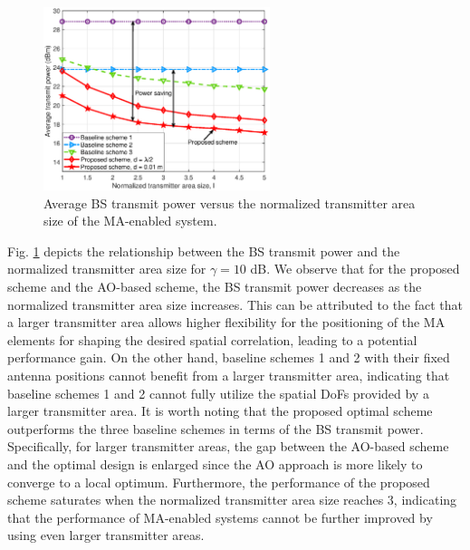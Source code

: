 \documentclass[12pt, draftclsnofoot, onecolumn]{IEEEtran}
\begin{document}
\begin{figure}
    \centering
    \includegraphics[width=2.6in]{figures/Tran_power_vs_Num_points_4_4_MIMO_FR_model.eps}
    \caption{Average BS transmit power versus the normalized transmitter area size of the MA-enabled system.}
    \label{fig::Region}
\end{figure}

Fig. \ref{fig::Region} depicts the relationship between the BS transmit power and the normalized transmitter area size for $\gamma=10$ dB. We observe that for the proposed scheme and the AO-based scheme, the BS transmit power decreases as the normalized transmitter area size increases. This can be attributed to the fact that a larger transmitter area allows higher flexibility for the positioning of the MA elements for shaping the desired spatial correlation, leading to a potential performance gain. On the other hand, baseline schemes 1 and 2 with their fixed antenna positions cannot benefit from a larger transmitter area, indicating that baseline schemes 1 and 2 cannot fully utilize the spatial DoFs provided by a larger transmitter area. It is worth noting that the proposed optimal scheme outperforms the three baseline schemes in terms of the BS transmit power. Specifically, for larger transmitter areas, the gap between the AO-based scheme and the optimal design is enlarged since the AO approach is more likely to converge to a local optimum. Furthermore, the performance of the proposed scheme saturates when the normalized transmitter area size reaches
$3$, indicating that the performance of MA-enabled systems cannot be further improved by using even larger transmitter areas. %

\end{document}
